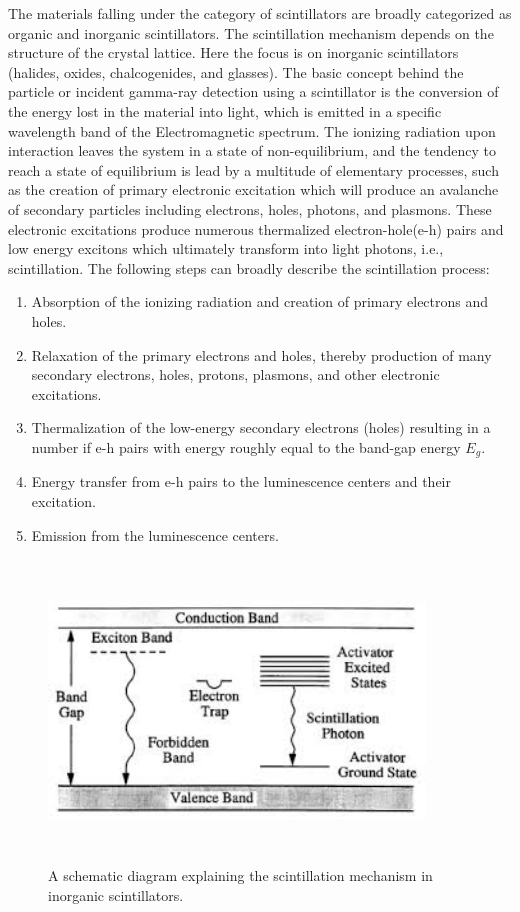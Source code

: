 \documentclass[a4paper,12pt,twoside]{report}
\begin{document}
The materials falling under the category of scintillators are broadly categorized as organic and inorganic scintillators. The scintillation mechanism depends on the structure of the crystal lattice. Here the focus is on inorganic scintillators (halides, oxides, chalcogenides, and glasses). The basic concept behind the particle or incident gamma-ray detection using a scintillator is the conversion of the energy lost in the material into light, which is emitted in a specific wavelength band of the Electromagnetic spectrum. 
The ionizing radiation upon interaction leaves the system in a state of non-equilibrium, and the tendency to reach a state of equilibrium is lead by a multitude of elementary processes, such as the creation of primary electronic excitation which will produce an avalanche of secondary particles including electrons, holes, photons, and plasmons. These electronic excitations produce numerous thermalized electron-hole(e-h) pairs and low energy excitons which ultimately transform into light photons, i.e., scintillation. The following steps can broadly describe the scintillation process:
\begin{enumerate}
    \item Absorption of the ionizing radiation and creation of primary electrons and holes.
    \item Relaxation of the primary electrons and holes, thereby production of many secondary electrons, holes, protons, plasmons, and other electronic excitations.
    \item Thermalization of the low-energy secondary electrons (holes) resulting in a number if e-h pairs with energy roughly equal to the band-gap energy $E_{g}$.
    \item Energy transfer from e-h pairs to the luminescence centers and their excitation.
    \item Emission from the luminescence centers.
\end{enumerate}
\begin{figure}[h!]
    \centering
    \includegraphics[width=10cm,height=8cm]{inorganic_scintillators_mechanism.jpeg}
    \caption[A schematic diagram explaining the scintillation]{A schematic diagram explaining the scintillation mechanism in inorganic scintillators. }
    \label{fig:scintillation_mechanism}
\end{figure}
\end{document}
